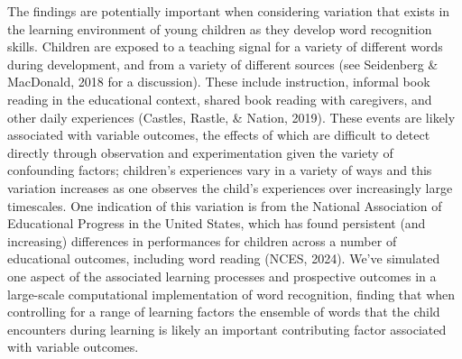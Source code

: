 \documentclass[
  ,man,floatsintext]{apa6}
\begin{document}
The findings are potentially important when considering variation that exists in the learning environment of young children as they develop word recognition skills. Children are exposed to a teaching signal for a variety of different words during development, and from a variety of different sources (see Seidenberg \& MacDonald, 2018 for a discussion). These include instruction, informal book reading in the educational context, shared book reading with caregivers, and other daily experiences (Castles, Rastle, \& Nation, 2019). These events are likely associated with variable outcomes, the effects of which are difficult to detect directly through observation and experimentation given the variety of confounding factors; children's experiences vary in a variety of ways and this variation increases as one observes the child's experiences over increasingly large timescales. One indication of this variation is from the National Association of Educational Progress in the United States, which has found persistent (and increasing) differences in performances for children across a number of educational outcomes, including word reading (NCES, 2024). We've simulated one aspect of the associated learning processes and prospective outcomes in a large-scale computational implementation of word recognition, finding that when controlling for a range of learning factors the ensemble of words that the child encounters during learning is likely an important contributing factor associated with variable outcomes.
\end{document}
